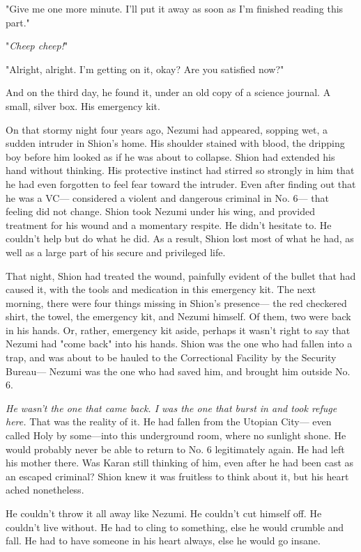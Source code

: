"Give me one more minute. I'll put it away as soon as I'm finished
reading this part."

"\emph{Cheep cheep!}"

"Alright, alright. I'm getting on it, okay? Are you satisfied now?"

And on the third day, he found it, under an old copy of a science
journal. A small, silver box. His emergency kit.

On that stormy night four years ago, Nezumi had appeared, sopping wet, a
sudden intruder in Shion's home. His shoulder stained with blood, the
dripping boy before him looked as if he was about to collapse. Shion had
extended his hand without thinking. His protective instinct had stirred
so strongly in him that he had even forgotten to feel fear toward the
intruder. Even after finding out that he was a VC--- considered a violent
and dangerous criminal in No. 6--- that feeling did not change. Shion took
Nezumi under his wing, and provided treatment for his wound and a
momentary respite. He didn't hesitate to. He couldn't help but do what
he did. As a result, Shion lost most of what he had, as well as a large
part of his secure and privileged life.

That night, Shion had treated the wound, painfully evident of the bullet
that had caused it, with the tools and medication in this emergency kit.
The next morning, there were four things missing in Shion's presence---
the red checkered shirt, the towel, the emergency kit, and Nezumi
himself. Of them, two were back in his hands. Or, rather, emergency kit
aside, perhaps it wasn't right to say that Nezumi had "come back" into
his hands. Shion was the one who had fallen into a trap, and was about
to be hauled to the Correctional Facility by the Security Bureau--- Nezumi
was the one who had saved him, and brought him outside No. 6.

\emph{He wasn't the one that came back. I was the one that burst in and took
refuge here.} That was the reality of it. He had fallen from the Utopian
City--- even called Holy by some---into this underground room, where no
sunlight shone. He would probably never be able to return to No. 6
legitimately again. He had left his mother there. Was Karan still
thinking of him, even after he had been cast as an escaped criminal?
Shion knew it was fruitless to think about it, but his heart ached
nonetheless.

He couldn't throw it all away like Nezumi. He couldn't cut himself off.
He couldn't live without. He had to cling to something, else he would
crumble and fall. He had to have someone in his heart always, else he
would go insane.

